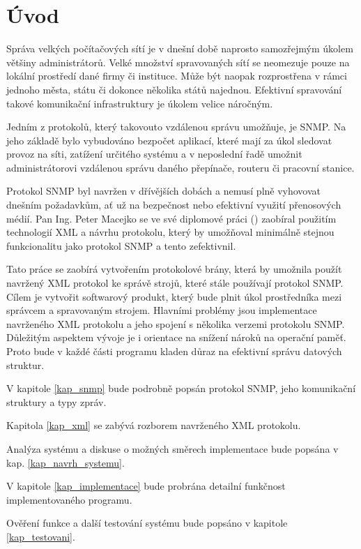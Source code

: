 \chapter{Úvod}
Správa velkých počítačových sítí je v dnešní době naprosto samozřejmým úkolem většiny administrátorů. Velké množství spravovaných sítí se neomezuje pouze na lokální prostředí dané firmy či instituce. Může být naopak rozprostřena 
v rámci jednoho města, státu či dokonce několika států najednou. Efektivní spravování takové komunikační infrastruktury je úkolem velice náročným.

Jedním z protokolů, který takovouto vzdálenou správu umožňuje, je SNMP. Na jeho základě bylo vybudováno bezpočet aplikací, které mají za úkol sledovat provoz na síti, zatížení určitého systému a v neposlední řadě umožnit administrátorovi
vzdálenou správu daného přepínače, routeru či pracovní stanice.

Protokol SNMP byl navržen v dřívějších dobách a nemusí plně vyhovovat dnešním požadavkům, ať už na bezpečnost nebo efektivní využití přenosových médií. Pan Ing. Peter Macejko se ve své diplomové práci (\cite{macejko_dipl}) zaobíral použitím 
technologií XML a návrhu protokolu, který by umožňoval minimálně stejnou funkcionalitu jako protokol SNMP a tento zefektivnil.

Tato práce se zaobírá vytvořením protokolové brány, která by umožnila použít navržený XML protokol ke správě strojů, které stále používají protokol SNMP. Cílem je vytvořit softwarový produkt, který bude plnit úkol prostředníka mezi správcem a spravovaným
strojem. Hlavními problémy jsou implementace navrženého XML protokolu a jeho spojení s několika verzemi protokolu SNMP. Důležitým aspektem vývoje je i orientace na snížení nároků na operační paměť. Proto bude v každé části programu kladen důraz na efektivní správu
datových struktur.

V kapitole \ref{kap_snmp} bude podrobně popsán protokol SNMP, jeho komunikační struktury a typy zpráv.

Kapitola \ref{kap_xml} se zabývá rozborem navrženého XML protokolu. 

Analýza systému a diskuse o možných směrech implementace bude popsána v kap. \ref{kap_navrh_systemu}.

V kapitole \ref{kap_implementace} bude probrána detailní funkčnost implementovaného programu.

Ověření funkce a další testování systému bude popsáno v kapitole \ref{kap_testovani}.

